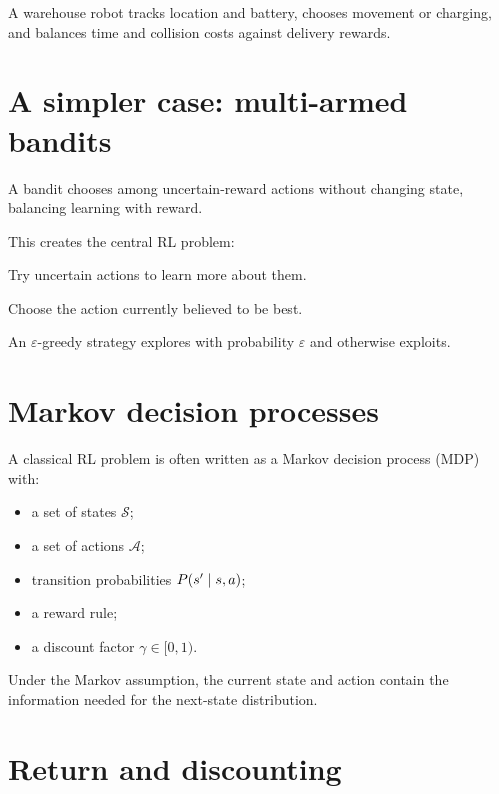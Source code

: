 \begin{workedexample}
A warehouse robot tracks location and battery, chooses movement or charging, and balances time and collision costs against delivery rewards.
\end{workedexample}

\section{A simpler case: multi-armed bandits}

A bandit chooses among uncertain-reward actions without changing state, balancing learning with reward.

This creates the central RL problem:

\begin{description}[leftmargin=1.35in,style=nextline]
  \item[Exploration] Try uncertain actions to learn more about them.
  \item[Exploitation] Choose the action currently believed to be best.
\end{description}

An $\varepsilon$-greedy strategy explores with probability $\varepsilon$ and otherwise exploits.

\section{Markov decision processes}

A classical RL problem is often written as a Markov decision process (MDP) with:

\begin{itemize}
  \item a set of states $\mathcal{S}$;
  \item a set of actions $\mathcal{A}$;
  \item transition probabilities $P(s'\mathrel{|} s,a)$;
  \item a reward rule;
  \item a discount factor $\gamma\in[0,1)$.
\end{itemize}

Under the Markov assumption, the current state and action contain the information needed for the next-state distribution.

\section{Return and discounting}

